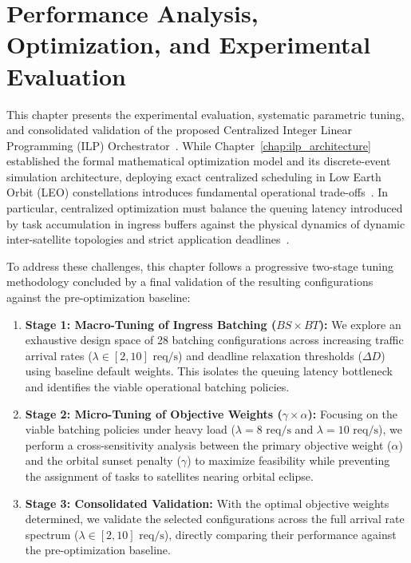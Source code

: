 \renewcommand{\topfraction}{0.95}       %
\renewcommand{\bottomfraction}{0.95}    %
\renewcommand{\textfraction}{0.05}      %
\renewcommand{\floatpagefraction}{0.85} %
\setcounter{topnumber}{2}
\setcounter{totalnumber}{3}


\chapter{Performance Analysis, Optimization, and Experimental Evaluation}
\label{chap:performance_analysis}

This chapter presents the experimental evaluation, systematic parametric tuning, and consolidated validation of the proposed Centralized Integer Linear Programming (ILP) Orchestrator~\cite{icdcs_satellite_2025}. While Chapter~\ref{chap:ilp_architecture} established the formal mathematical optimization model and its discrete-event simulation architecture, deploying exact centralized scheduling in Low Earth Orbit (LEO) constellations introduces fundamental operational trade-offs~\cite{denby2019orbital, survey_orbital_edge_2023}. In particular, centralized optimization must balance the queuing latency introduced by task accumulation in ingress buffers against the physical dynamics of dynamic inter-satellite topologies and strict application deadlines~\cite{icdcs_satellite_2025, zhong2025leo}.

To address these challenges, this chapter follows a progressive two-stage tuning methodology concluded by a final validation of the resulting configurations against the pre-optimization baseline:
\begin{enumerate}
    \item \textbf{Stage 1: Macro-Tuning of Ingress Batching ($BS \times BT$):} We explore an exhaustive design space of 28 batching configurations across increasing traffic arrival rates ($\lambda \in [2, 10]\text{ req/s}$) and deadline relaxation thresholds ($\Delta D$) using baseline default weights. This isolates the queuing latency bottleneck and identifies the viable operational batching policies.
    \item \textbf{Stage 2: Micro-Tuning of Objective Weights ($\gamma \times \alpha$):} Focusing on the viable batching policies under heavy load ($\lambda = 8\text{ req/s}$ and $\lambda = 10\text{ req/s}$), we perform a cross-sensitivity analysis between the primary objective weight ($\alpha$) and the orbital sunset penalty ($\gamma$) to maximize feasibility while preventing the assignment of tasks to satellites nearing orbital eclipse.
    \item \textbf{Stage 3: Consolidated Validation:} With the optimal objective weights determined, we validate the selected configurations across the full arrival rate spectrum ($\lambda \in [2, 10]\text{ req/s}$), directly comparing their performance against the pre-optimization baseline.
\end{enumerate}

